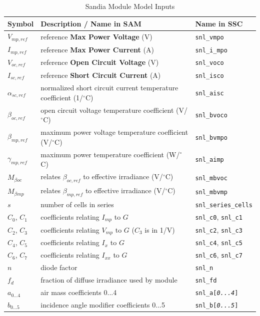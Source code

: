 \documentclass[12pt,letterpaper]{article}
\begin{document}
\begin{table}
\begin{center}
\caption{Sandia Module Model Inputs}
\begin{tabular}{lll}
\midrule
Symbol & Description / \textbf{Name in SAM} & Name in SSC \\
\midrule
$V_{mp,ref}$ & reference \textbf{Max Power Voltage} (V)&\texttt{snl\_vmpo} \\
$I_{mp,ref}$ & reference \textbf{Max Power Current} (A)& \texttt{snl\_i\_mpo} \\
$V_{oc,ref}$ & reference \textbf{Open Circuit Voltage} (V)& \texttt{snl\_voco} \\
$I_{sc,ref}$ & reference \textbf{Short Circuit Current} (A) & \texttt{snl\_isco} \\
$\alpha_{sc,ref}$ & normalized short circuit current temperature coefficient   (1/$^\circ$C) & \texttt{snl\_aisc}\\
$\beta_{oc,ref}$ & open circuit voltage temperature coefficient  (V/$^\circ$C)& \texttt{snl\_bvoco} \\
$\beta_{mp,ref}$ & maximum power voltage temperature coefficient  (V/$^\circ$C)& \texttt{snl\_bvmpo} \\
$\gamma_{mp,ref}$ & maximum power temperature coefficient  (W/$^\circ$C)& \texttt{snl\_aimp} \\
$M_{\beta oc}$ & relates $\beta_{oc,ref}$ to effective irradiance (V/$^\circ$C)& \texttt{snl\_mbvoc} \\
$M_{\beta mp}$ & relates $\beta_{mp,ref}$ to effective irradiance (V/$^\circ$C)& \texttt{snl\_mbvmp} \\
$s$ & number of cells in series & \texttt{snl\_series\_cells} \\
$C_0$, $C_1$ & coefficients relating $I_{mp}$ to $G$ & \texttt{snl\_c0}, \texttt{snl\_c1} \\
$C_2$, $C_3$ & coefficients relating $V_{mp}$ to $G$ ($C_3$ is in 1/V)& \texttt{snl\_c2}, \texttt{snl\_c3} \\
$C_4$, $C_5$ & coefficients relating $I_x$ to $G$ & \texttt{snl\_c4}, \texttt{snl\_c5} \\
$C_6$, $C_7$ & coefficients relating $I_{xx}$ to $G$ & \texttt{snl\_c6}, \texttt{snl\_c7} \\
$n$ & diode factor & \texttt{snl\_n} \\
$f_d$ & fraction of diffuse irradiance used by module & \texttt{snl\_fd} \\
$a_{0...4}$ & air mass coefficients 0...4 & \texttt{snl\_a[\textit{0...4}]} \\
$b_{0...5}$ & incidence angle modifier coefficients 0...5 & \texttt{snl\_b[\textit{0...5}]} 
\\
\hline
\end{tabular}
\label{tab-sandiamodulevars}
\end{center}
\end{table}
\end{document}
